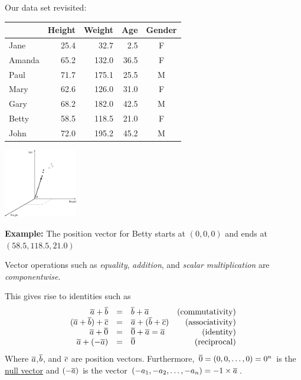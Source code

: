 \documentclass[a4paper,blends,pdf,colorBG,slideColor]{prosper}
\begin{document}
\es


Our data set revisited:

\begin{center}
{\tiny
   \begin{tabular}{ l rrr c}
      \toprule
         & Height  & Weight & Age & Gender\\
      \midrule
      Jane      & 25.4 & 32.7 & 2.5 & F \\
      Amanda & 65.2 & 132.0 & 36.5 & F \\
      Paul      & 71.7 & 175.1 & 25.5 & M \\
      Mary      & 62.6 & 126.0 & 31.0 & F \\
      Gary      & 68.2 & 182.0 & 42.5 & M \\
     Betty      & 58.5 & 118.5 & 21.0 & F \\
     John  & 72.0 & 195.2 & 45.2 & M\\
      \bottomrule
   \end{tabular}
}
\end{center}

\includegraphics[height=30mm]{figures/fig03-02.eps}

{\bf Example:} The position vector for Betty starts at $(0,0,0)$ and ends at $(58.5,118.5,21.0)$
\es

Vector operations such as {\em equality}, {\em addition}, and {\em scalar multiplication}
are {\em componentwise}.


This gives rise to identities such as
\[
\begin{array}{rclr}
\overline{a} + \overline{b} & = & \overline{b} + \overline{a} & \mbox{(commutativity)}\\
(\overline{a} + \overline{b}) + \overline{c} & = & \overline{a} + (\overline{b} + \overline{c}) & \mbox{(associativity)}\\
\overline{a} + \overline{0} & = & \overline{0} + \overline{a} = \overline{a}& \mbox{(identity)}\\
\overline{a} + (-\overline{a}) & = & \overline{0} & \mbox{ (reciprocal)}
\end{array}
\]
Where  $\overline{a}$,$\overline{b}$, and $\overline{c}$ are position vectors.
Furthermore, $\overline{0} = (0,0,\ldots,0)= 0^n$ is the \ul{null vector} and $(-\overline{a})$ is the 
vector $(-a_1,-a_2,\ldots,-a_n) = -1 \times \overline{a}$.
\es
\end{document}
